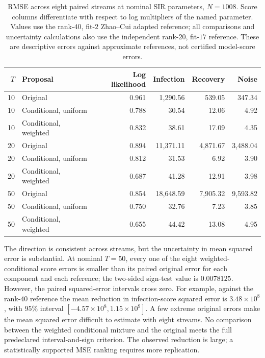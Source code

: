 \begin{table}[htbp]
\centering\small
\setlength{\tabcolsep}{4pt}
\begin{tabular}{rlrrrr}
\toprule
$T$ & Proposal & Log likelihood & Infection & Recovery & Noise\\
\midrule
10 & Original & 0.961 & 1{,}290.56 & 539.05 & 347.34\\
10 & Conditional, uniform & 0.788 & 30.54 & 12.06 & 4.92\\
10 & Conditional, weighted & 0.832 & 38.61 & 17.09 & 4.35\\
20 & Original & 0.894 & 11{,}371.11 & 4{,}871.67 & 3{,}488.04\\
20 & Conditional, uniform & 0.812 & 31.53 & 6.92 & 3.90\\
20 & Conditional, weighted & 0.687 & 41.28 & 12.91 & 3.98\\
50 & Original & 0.854 & 18{,}648.59 & 7{,}905.32 & 9{,}593.82\\
50 & Conditional, uniform & 0.750 & 32.76 & 7.23 & 3.85\\
50 & Conditional, weighted & 0.655 & 44.42 & 13.08 & 4.95\\
\bottomrule
\end{tabular}
\caption{RMSE across eight paired streams at nominal SIR parameters,
$N=1008$. Score columns differentiate with respect to log multipliers of the
named parameter. Values use the rank-$40$, fit-$2$ Zhao--Cui adapted reference;
all comparisons and uncertainty calculations also use the independent
rank-$20$, fit-$17$ reference. These are descriptive errors against approximate
references, not certified model-score errors.}
\label{tab:parent-nominal-accuracy}
\end{table}

The direction is consistent across streams, but the uncertainty in mean
squared error is substantial. At nominal $T=50$, every one of the eight
weighted-conditional score errors is smaller than its paired original error
for each component and each reference; the two-sided sign-test value is
$0.0078125$. However, the paired squared-error intervals cross zero. For
example, against the rank-$40$ reference the mean reduction in infection-score
squared error is $3.48\times10^8$, with $95\%$ interval
$[-4.57\times10^8,1.15\times10^9]$. A few extreme original errors make the
mean squared error difficult to estimate with eight streams. No comparison
between the weighted conditional mixture and the original meets the full
predeclared interval-and-sign criterion. The observed reduction is large;
a statistically supported MSE ranking requires more replication.

